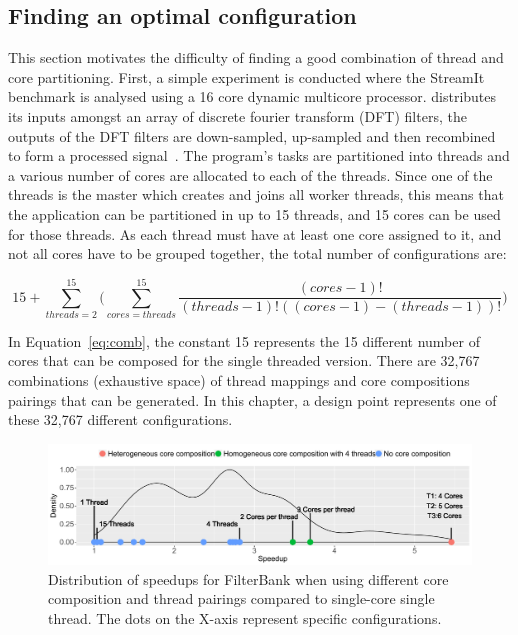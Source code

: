\subsection{Finding an optimal configuration}
This section motivates the difficulty of finding a good combination of thread and core partitioning.
First, a simple experiment is conducted where the  StreamIt benchmark is analysed using a 16 core dynamic multicore processor.
 distributes its inputs amongst an array of discrete fourier transform (DFT) filters, the outputs of the DFT filters are down-sampled, up-sampled and then recombined to form a processed signal~\cite{streamitrepo}.
The program's tasks are partitioned into threads and a various number of cores are allocated to each of the threads.
Since one of the threads is the master which creates and joins all worker threads, this means that the application can be partitioned in up to 15 threads, and 15 cores can be used for those threads.
As each thread must have at least one core assigned to it, and not all cores have to be grouped together, the total number of configurations are:

\begin{equation}
15 + \sum_{threads=2}^{15} \bigg( \sum_{cores=threads}^{15} \frac{(cores-1)!}{(threads-1)!((cores-1)-(threads-1))!}\bigg)
\label{eq:comb}
\end{equation}

In Equation~\ref{eq:comb}, the constant 15 represents the 15 different number of cores that can be composed for the single threaded version.
There are 32,767 combinations (exhaustive space) of thread mappings and core compositions pairings that can be generated.
In this chapter, a design point represents one of these 32,767 different configurations.

\begin{figure}[t]
    \centering
    \includegraphics[width=1\textwidth]{streamit-paper/graphics/filterbank_motivation_4.pdf}
    \caption{Distribution of speedups for FilterBank when using different core composition and thread pairings compared to single-core single thread. The dots on the X-axis represent specific configurations.}
     \label{fig:threadcoremotiv}
	 \vspace{-1em}
\end{figure}

